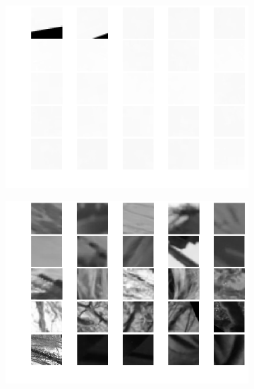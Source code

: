 \documentclass{paper}
\begin{document}
\begin{figure}
  \centering
  \begin{subfigure}[b]{0.32\textwidth}
    \includegraphics[width=\textwidth]{word65_uniform}
    \label{fig:65}
  \end{subfigure}
  \begin{subfigure}[b]{0.32\textwidth}
    \includegraphics[width=\textwidth]{word147}
  \end{subfigure}
    \begin{subfigure}[b]{0.32\textwidth}    

\end{subfigure}
\end{figure}
\end{document}
